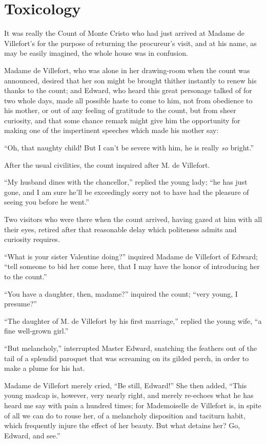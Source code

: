 \chapter{Toxicology}

It was really the Count of Monte Cristo who had just arrived at Madame
de Villefort’s for the purpose of returning the procureur’s visit, and
at his name, as may be easily imagined, the whole house was in
confusion.

Madame de Villefort, who was alone in her drawing-room when the count
was announced, desired that her son might be brought thither instantly
to renew his thanks to the count; and Edward, who heard this great
personage talked of for two whole days, made all possible haste to come
to him, not from obedience to his mother, or out of any feeling of
gratitude to the count, but from sheer curiosity, and that some chance
remark might give him the opportunity for making one of the impertinent
speeches which made his mother say:

“Oh, that naughty child! But I can’t be severe with him, he is really
\textit{so} bright.”

After the usual civilities, the count inquired after M. de Villefort.

“My husband dines with the chancellor,” replied the young lady; “he has
just gone, and I am sure he’ll be exceedingly sorry not to have had the
pleasure of seeing you before he went.”

Two visitors who were there when the count arrived, having gazed at him
with all their eyes, retired after that reasonable delay which
politeness admits and curiosity requires.

“What is your sister Valentine doing?” inquired Madame de Villefort of
Edward; “tell someone to bid her come here, that I may have the honor
of introducing her to the count.”

“You have a daughter, then, madame?” inquired the count; “very young, I
presume?”

“The daughter of M. de Villefort by his first marriage,” replied the
young wife, “a fine well-grown girl.”

“But melancholy,” interrupted Master Edward, snatching the feathers out
of the tail of a splendid paroquet that was screaming on its gilded
perch, in order to make a plume for his hat.

Madame de Villefort merely cried, “Be still, Edward!” She then added,
“This young madcap is, however, very nearly right, and merely re-echoes
what he has heard me say with pain a hundred times; for Mademoiselle de
Villefort is, in spite of all we can do to rouse her, of a melancholy
disposition and taciturn habit, which frequently injure the effect of
her beauty. But what detains her? Go, Edward, and see.”

